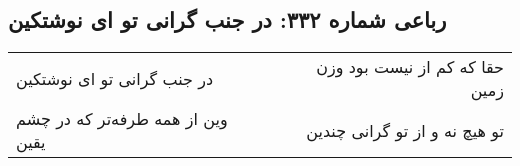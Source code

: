 \begin{center}
\section*{رباعی شماره ۳۳۲: در جنب گرانی تو ای نوشتکین}
\label{sec:sh332}
\begin{longtable}{l p{0.5cm} r}
در جنب گرانی تو ای نوشتکین
&&
حقا که کم از نیست بود وزن زمین
\\
وین از همه طرفه‌تر که در چشم یقین
&&
تو هیچ نه و از تو گرانی چندین
\\
\end{longtable}
\end{center}
